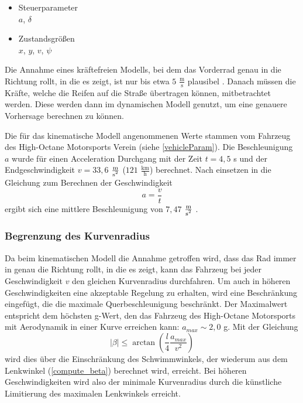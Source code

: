 \documentclass{like}
\begin{document}
\begin{itemize}
	\item Steuerparameter  \\
	\(a\), \(\delta\)
	\item Zustandsgrößen \\
	\(x\), \(y\), \(v\), \(\psi\)
	
\end{itemize}


Die Annahme eines kräftefreien Modells, bei dem das Vorderrad genau in die Richtung rollt, in die es zeigt, ist nur bis etwa $5$ $ \frac{\text{m}}{\text{s}}$ plausibel \cite{rajamani2011vehicle}. Danach müssen die Kräfte, welche die Reifen auf die Straße übertragen können, mitbetrachtet werden. Diese werden dann im dynamischen Modell genutzt, um eine genauere Vorhersage berechnen zu können.

Die für das kinematische Modell angenommenen Werte stammen vom Fahrzeug des High-Octane Motorsports Verein (siehe \ref{vehicleParam}). Die Beschleunigung \(a\) wurde für einen Acceleration Durchgang mit der Zeit $t = 4,5$ s und der Endgeschwindigkeit $v = 33,6$ $\frac{\text{m}}{\text{s\textsuperscript{2}}}$  ($121$  $\frac{\text{km}}{\text{h}}$) berechnet. Nach einsetzen in die Gleichung zum Berechnen der Geschwindigkeit 
\begin{equation}
a = \frac{v}{t}  \label{long_acc_kin}
\end{equation}
ergibt sich eine mittlere Beschleunigung von $7,47$ $ \frac{\text{m}}{\text{s\textsuperscript{2}}}$ .


\subsubsection*{Begrenzung des Kurvenradius}
\label{betaMax}
Da beim kinematischen Modell die Annahme getroffen wird, dass das Rad immer in genau die Richtung rollt, in die es zeigt, kann das Fahrzeug bei jeder Geschwindigkeit \(v\) den gleichen Kurvenradius durchfahren. Um auch in höheren Geschwindigkeiten eine akzeptable Regelung zu erhalten, wird eine Beschränkung eingefügt, die die maximale Querbeschleunigung beschränkt. Der Maximalwert entspricht dem höchsten g-Wert, den das Fahrzeug des High-Octane Motorsports mit Aerodynamik in einer Kurve erreichen kann: $a_{max} \sim 2,0$ g. 
Mit der Gleichung
\begin{equation}
	|\beta| \leq \arctan \left(\frac{l}{4} \frac{a_{max}}{v^2} \right) \label{limitLatAcc}
\end{equation}
wird dies über die Einschränkung des Schwimmwinkels, der wiederum aus dem Lenkwinkel (\ref{compute_beta}) berechnet wird, erreicht. Bei höheren Geschwindigkeiten wird also der minimale Kurvenradius durch die künstliche Limitierung des maximalen Lenkwinkels erreicht. 
\end{document}
